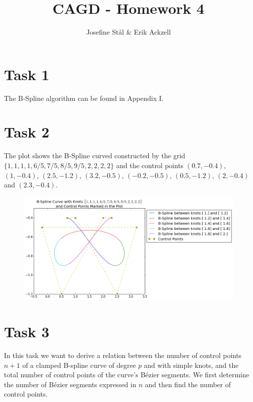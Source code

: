 \documentclass[]{article}
\title{CAGD - Homework 4}
\author{Josefine St{\aa}l \& Erik Ackzell}
\begin{document}
\maketitle
\section*{Task 1}
The B-Spline algorithm can be found in Appendix I. 

\section*{Task 2}
The plot shows the B-Spline curved constructed by the grid $\{1,1,1,1,6/5,7/5,8/5,9/5,2,2,2,2\}$ and the control points $(0.7,-0.4)$, $(1,-0.4)$, $(2.5,-1.2)$, $(3.2,-0.5)$, $(-0.2,-0.5)$, $(0.5,-1.2)$, $(2,-0.4)$ and $(2.3,-0.4)$. 
\begin{figure}[h!]
	\includegraphics[scale=0.5]{task2}
\end{figure}

\section*{Task 3}
In this task we want to derive a relation between the number of control points $n+1$ of a clamped B-spline curve of degree $p$ and with simple knots, and the total number of control points of the curve's B\'{e}zier segments. We first determine the number of B\'{e}zier segments expressed in $n$ and then find the number of control points.
\end{document}
